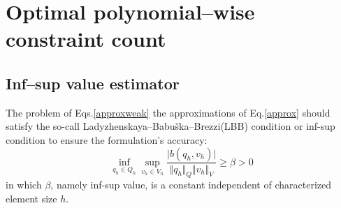 \section{Optimal polynomial--wise constraint count}
\subsection{Inf--sup value estimator}
The problem of Eqs.\eqref{approxweak} the approximations of Eq.\eqref{approx} should satisfy the so-call Ladyzhenskaya–Babuška–Brezzi(LBB) condition or inf-sup condition \cite{bathe1996} to ensure the formulation's accuracy:
\begin{equation}\label{infsup}
    \inf_{q_h \in Q_h} \sup_{v_h \in V_h} \frac{\vert b(q_h,v_h) \vert}{\Vert q_h \Vert_Q \Vert v_h \Vert_V} \ge \beta > 0
\end{equation}
in which $\beta$, namely inf-sup value, is a constant independent of characterized element size $h$.

